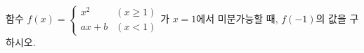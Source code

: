 함수 $f(x)=\begin{cases} x^2 & (x\ge 1) \\ ax+b & (x<1) \end{cases}$가 $x=1$에서 미분가능할 때, $f(-1)$의 값을 구하시오. 
